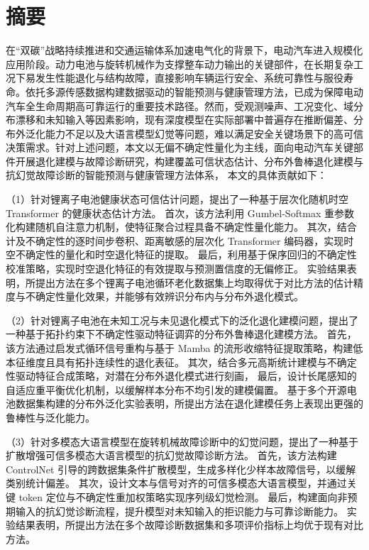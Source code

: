 \chapter{摘\quad 要}%
\setcounter{page}{2}%
\linespread{1.5}

在“双碳”战略持续推进和交通运输体系加速电气化的背景下，电动汽车进入规模化应用阶段。动力电池与旋转机械作为支撑整车动力输出的关键部件，在长期复杂工况下易发生性能退化与结构故障，直接影响车辆运行安全、系统可靠性与服役寿命。依托多源传感数据构建数据驱动的智能预测与健康管理方法，已成为保障电动汽车全生命周期高可靠运行的重要技术路径。然而，受观测噪声、工况变化、域分布漂移和未知输入等因素影响，现有深度模型在实际部署中普遍存在推断偏差、分布外泛化能力不足以及大语言模型幻觉等问题，难以满足安全关键场景下的高可信决策需求。针对上述问题，本文以无偏不确定性量化为主线，面向电动汽车关键部件开展退化建模与故障诊断研究，构建覆盖可信状态估计、分布外鲁棒退化建模与抗幻觉故障诊断的智能预测与健康管理方法体系，
% 
本文的具体贡献如下：

（1）针对锂离子电池健康状态可信估计问题，提出了一种基于层次化随机时空 Transformer 的健康状态估计方法。
首次，该方法利用 Gumbel-Softmax 重参数化构建随机自注意力机制，使特征聚合过程具备不确定性量化能力。
其次，结合计及不确定性的逐时间步卷积、距离敏感的层次化 Transformer 编码器，实现时空不确定性的量化和时空退化特征的提取。
最后，利用基于保序回归的不确定性校准策略，实现时空退化特征的有效提取与预测置信度的无偏修正。
实验结果表明，所提出方法在多个锂离子电池循环老化数据集上均取得优于对比方法的估计精度与不确定性量化效果，并能够有效辨识分布内与分布外退化模式。

（2）针对锂离子电池在未知工况与未见退化模式下的泛化退化建模问题，提出了一种基于拓扑约束下不确定性驱动特征调弈的分布外鲁棒退化建模方法。
首先，该方法通过启发式循环信号重构与基于 Mamba 的流形收缩特征提取策略，构建低本征维度且具有拓扑连续性的退化表征。
其次，结合多元高斯统计建模与不确定性驱动特征合成策略，对潜在分布外退化模式进行刻画，
最后，设计长尾感知的自适应重平衡优化机制，以缓解样本分布不均引发的建模偏置。
基于多个开源电池数据集构建的分布外泛化实验表明，所提出方法在退化建模任务上表现出更强的鲁棒性与泛化能力。

（3）针对多模态大语言模型在旋转机械故障诊断中的幻觉问题，提出了一种基于扩散增强可信多模态大语言模型的抗幻觉故障诊断方法。
首先，该方法构建 ControlNet 引导的跨数据集条件扩散模型，生成多样化少样本故障信号，以缓解类别统计偏差。
其次，设计文本与信号对齐的可信多模态大语言模型，并通过关键 token 定位与不确定性重加权策略实现序列级幻觉检测。
最后，构建面向非预期输入的抗幻觉诊断流程，提升模型对未知输入的拒识能力与可靠诊断能力。
实验结果表明，所提出方法在多个故障诊断数据集和多项评价指标上均优于现有对比方法。

